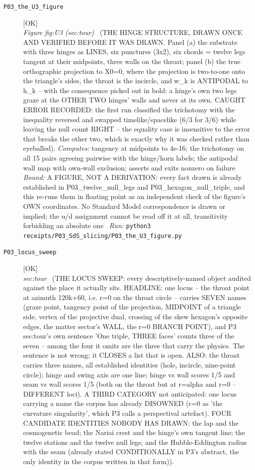 \begin{description}
\item[\label{rcpt:P03_the_U3_figure}\texttt{P03\_the\_U3\_figure}]\hfill\textsf{[OK]}\\
\textit{Figure fig:U3 (sec:tour)} \ (THE HINGE STRUCTURE, DRAWN ONCE AND VERIFIED BEFORE IT WAS DRAWN. Panel (a) the substrate with three hinges as LINES, six punctures (3x2), six chords = twelve legs tangent at their midpoints, three walls on the throat; panel (b) the true orthographic projection to X0=0, where the projection is two-to-one onto the triangle's sides, the throat is the incircle, and w\_k is ANTIPODAL to h\_k -- with the consequence picked out in bold: a hinge's own two legs graze at the OTHER TWO hinges' walls and never at its own. CAUGHT ERROR RECORDED: the first run classified the trichotomy with the inequality reversed and swapped timelike/spacelike (6/3 for 3/6) while leaving the null count RIGHT -- the equality case is insensitive to the error that breaks the other two, which is exactly why it was checked rather than eyeballed). 
\emph{Computes:} tangency at midpoints to 4e-16; the trichotomy on all 15 pairs agreeing pairwise with the hinge/horn labels; the antipodal wall map with own-wall exclusion; asserts and exits nonzero on failure
 \emph{Bound:} A FIGURE, NOT A DERIVATION: every fact drawn is already established in P03\_twelve\_null\_legs and P03\_hexagon\_null\_triple, and this re-runs them in floating point as an independent check of the figure's OWN coordinates. No Standard Model correspondence is drawn or implied; the u/d assignment cannot be read off it at all, transitivity forbidding an absolute one
\ \emph{Run:} \texttt{python3 receipts/P03\_SdS\_slicing/P03\_the\_U3\_figure.py}
\item[\label{rcpt:P03_locus_sweep}\texttt{P03\_locus\_sweep}]\hfill\textsf{[OK]}\\
\textit{sec:tour} \ (THE LOCUS SWEEP: every descriptively-named object audited against the place it actually sits. HEADLINE: one locus -- the throat point at azimuth 120k+60, i.e. r=0 on the throat circle -- carries SEVEN names (graze point, tangency point of the projection, MIDPOINT of a triangle side, vertex of the projective dual, crossing of the skew hexagon's opposite edges, the matter sector's WALL, the r=0 BRANCH POINT), and P3 sec:tour's own sentence 'One triple, THREE faces' counts three of the seven -- among the four it omits are the three that carry the physics. The sentence is not wrong; it CLOSES a list that is open. ALSO: the throat carries three names, all established identities (hole, incircle, nine-point circle); hinge and swing axis are one line; hinge vs wall scores 1/5 and seam vs wall scores 1/5 (both on the throat but at r=alpha and r=0 -- DIFFERENT loci). A THIRD CATEGORY not anticipated: one locus carrying a name the corpus has already DISOWNED (r=0 as 'the curvature singularity', which P3 calls a perspectival artefact). FOUR CANDIDATE IDENTITIES NOBODY HAS DRAWN: the lap and the cosmogenetic bead; the Nariai crest and the hinge's own tangent line; the twelve stations and the twelve null legs; and the Hubble-Eddington radius with the seam (already stated CONDITIONALLY in P3's abstract, the only identity in the corpus written in that form)). 

\end{description}
